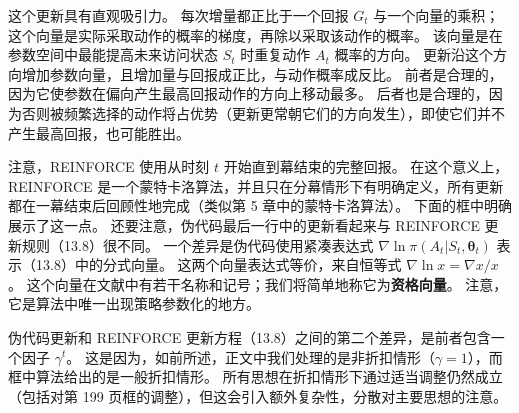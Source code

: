 \documentclass[UTF8,12pt,a4paper,fontset=fandol]{ctexart}
\begin{document}
这个更新具有直观吸引力。
每次增量都正比于一个回报 $G_t$ 与一个向量的乘积；这个向量是实际采取动作的概率的梯度，再除以采取该动作的概率。
该向量是在参数空间中最能提高未来访问状态 $S_t$ 时重复动作 $A_t$ 概率的方向。
更新沿这个方向增加参数向量，且增加量与回报成正比，与动作概率成反比。
前者是合理的，因为它使参数在偏向产生最高回报动作的方向上移动最多。
后者也是合理的，因为否则被频繁选择的动作将占优势（更新更常朝它们的方向发生），即使它们并不产生最高回报，也可能胜出。

注意，REINFORCE 使用从时刻 $t$ 开始直到幕结束的完整回报。
在这个意义上，REINFORCE 是一个蒙特卡洛算法，并且只在分幕情形下有明确定义，所有更新都在一幕结束后回顾性地完成（类似第 5 章中的蒙特卡洛算法）。
下面的框中明确展示了这一点。
还要注意，伪代码最后一行中的更新看起来与 REINFORCE 更新规则（13.8）很不同。
一个差异是伪代码使用紧凑表达式 $\nabla\ln\pi(A_t|S_t,\boldsymbol{\theta}_t)$ 表示（13.8）中的分式向量。
这两个向量表达式等价，来自恒等式 $\nabla\ln x=\nabla x/x$。
这个向量在文献中有若干名称和记号；我们将简单地称它为\textbf{资格向量}。
注意，它是算法中唯一出现策略参数化的地方。

\begin{center}
\end{center}

伪代码更新和 REINFORCE 更新方程（13.8）之间的第二个差异，是前者包含一个因子 $\gamma^t$。
这是因为，如前所述，正文中我们处理的是非折扣情形（$\gamma=1$），而框中算法给出的是一般折扣情形。
所有思想在折扣情形下通过适当调整仍然成立（包括对第 199 页框的调整），但这会引入额外复杂性，分散对主要思想的注意。
\end{document}
